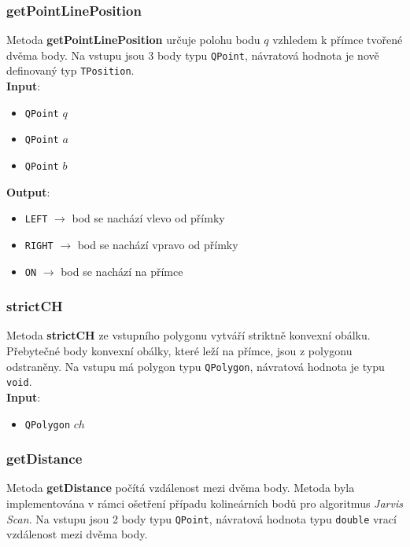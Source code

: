\documentclass[a4paper, 12pt]{article}
\begin{document}
\subsubsection*{getPointLinePosition}
Metoda \textbf{getPointLinePosition} určuje polohu bodu $q$ vzhledem k přímce tvořené dvěma body. Na vstupu jsou 3 body typu \texttt{QPoint}, návratová hodnota je nově definovaný typ \texttt{TPosition}.\\

\textbf{Input}:
\begin{itemize}
\item \texttt{QPoint} $q$
\item \texttt{QPoint} $a$
\item \texttt{QPoint} $b$
\end{itemize}

\textbf{Output}:
\begin{itemize}
\item \texttt{LEFT} $\rightarrow$ bod se nachází vlevo od přímky
\item \texttt{RIGHT} $\rightarrow$ bod se nachází vpravo od přímky
\item \texttt{ON} $\rightarrow$ bod se nachází na přímce
\end{itemize}

\subsubsection*{strictCH}
Metoda \textbf{strictCH} ze vstupního polygonu vytváří striktně konvexní obálku. Přebytečné body konvexní obálky, které leží na přímce, jsou z polygonu odstraněny. Na vstupu má polygon typu \texttt{QPolygon}, návratová hodnota je typu \texttt{void}.\\ 

\textbf{Input}:
\begin{itemize}
\item \texttt{QPolygon} $ch$ 
\end{itemize}

\subsubsection*{getDistance}
Metoda \textbf{getDistance} počítá vzdálenost mezi dvěma body. Metoda byla implementována v rámci ošetření případu kolineárních bodů pro algoritmus \textit{Jarvis Scan}. Na vstupu jsou 2 body typu \texttt{QPoint}, návratová hodnota typu \texttt{double} vrací vzdálenost mezi dvěma body.\\ 
\end{document}
